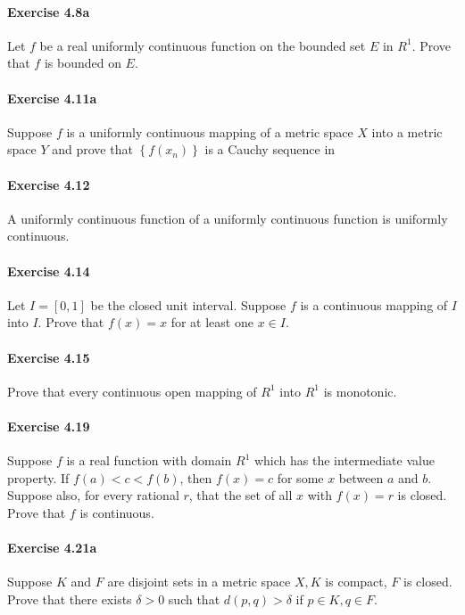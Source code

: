\documentclass{article}
\begin{document}
\paragraph{Exercise 4.8a} Let $f$ be a real uniformly continuous function on the bounded set $E$ in $R^{1}$. Prove that $f$ is bounded on $E$.

\paragraph{Exercise 4.11a} Suppose $f$ is a uniformly continuous mapping of a metric space $X$ into a metric space $Y$ and prove that $\left\{f\left(x_{n}\right)\right\}$ is a Cauchy sequence in

\paragraph{Exercise 4.12} A uniformly continuous function of a uniformly continuous function is uniformly continuous.

\paragraph{Exercise 4.14} Let $I=[0,1]$ be the closed unit interval. Suppose $f$ is a continuous mapping of $I$ into $I$. Prove that $f(x)=x$ for at least one $x \in I$.

\paragraph{Exercise 4.15} Prove that every continuous open mapping of $R^{1}$ into $R^{1}$ is monotonic.

\paragraph{Exercise 4.19} Suppose $f$ is a real function with domain $R^{1}$ which has the intermediate value property. If $f(a)<c<f(b)$, then $f(x)=c$ for some $x$ between $a$ and $b$. Suppose also, for every rational $r$, that the set of all $x$ with $f(x)=r$ is closed. Prove that $f$ is continuous.

\paragraph{Exercise 4.21a} Suppose $K$ and $F$ are disjoint sets in a metric space $X, K$ is compact, $F$ is closed. Prove that there exists $\delta>0$ such that $d(p, q)>\delta$ if $p \in K, q \in F$.
\end{document}
